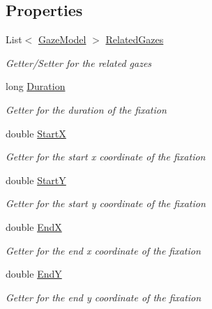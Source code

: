 \subsection*{Properties}
\begin{DoxyCompactItemize}
\item 
List$<$ \hyperlink{class_web_analyzer_1_1_models_1_1_data_model_1_1_gaze_model}{Gaze\+Model} $>$ \hyperlink{class_web_analyzer_1_1_models_1_1_analysis_model_1_1_fixation_model_a478001ceab5fb747d7d33cbd81382932}{Related\+Gazes}
\begin{DoxyCompactList}\small\item\em Getter/\+Setter for the related gazes \end{DoxyCompactList}\item 
long \hyperlink{class_web_analyzer_1_1_models_1_1_analysis_model_1_1_fixation_model_a045eca17df1de4d293b5d38b1c812040}{Duration}
\begin{DoxyCompactList}\small\item\em Getter for the duration of the fixation \end{DoxyCompactList}\item 
double \hyperlink{class_web_analyzer_1_1_models_1_1_analysis_model_1_1_fixation_model_af8b292c9e9e04c3b1b1c617fe3a44e06}{Start\+X}
\begin{DoxyCompactList}\small\item\em Getter for the start x coordinate of the fixation \end{DoxyCompactList}\item 
double \hyperlink{class_web_analyzer_1_1_models_1_1_analysis_model_1_1_fixation_model_a187714460ee0851def122bd776fbda91}{Start\+Y}
\begin{DoxyCompactList}\small\item\em Getter for the start y coordinate of the fixation \end{DoxyCompactList}\item 
double \hyperlink{class_web_analyzer_1_1_models_1_1_analysis_model_1_1_fixation_model_a0b77bda45070dad7347eaa90daf29247}{End\+X}
\begin{DoxyCompactList}\small\item\em Getter for the end x coordinate of the fixation \end{DoxyCompactList}\item 
double \hyperlink{class_web_analyzer_1_1_models_1_1_analysis_model_1_1_fixation_model_a431705c50a74006b786fbcf7e357567f}{End\+Y}
\begin{DoxyCompactList}\small\item\em Getter for the end y coordinate of the fixation \end{DoxyCompactList}\end{DoxyCompactItemize}
